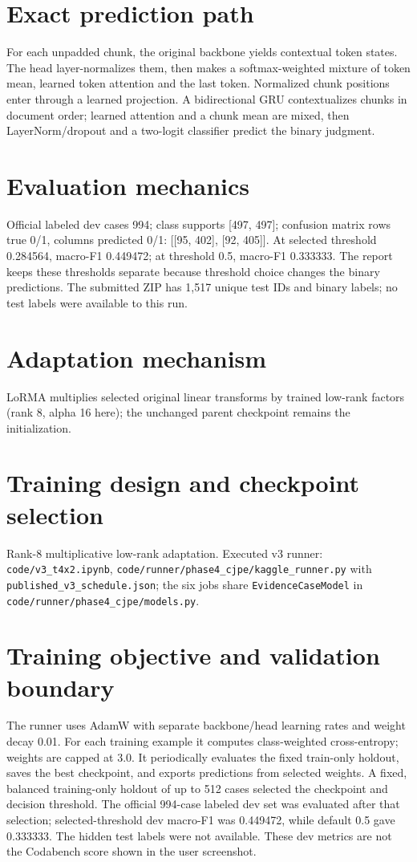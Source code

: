 \documentclass[11pt,a4paper]{article}
\begin{document}
\section{Exact prediction path}
For each unpadded chunk, the original backbone yields contextual token states. The head layer-normalizes them, then makes a softmax-weighted mixture of token mean, learned token attention and the last token. Normalized chunk positions enter through a learned projection. A bidirectional GRU contextualizes chunks in document order; learned attention and a chunk mean are mixed, then LayerNorm/dropout and a two-logit classifier predict the binary judgment.
\section{Evaluation mechanics}
Official labeled dev cases 994; class supports [497, 497]; confusion matrix rows true 0/1, columns predicted 0/1: [[95, 402], [92, 405]]. At selected threshold 0.284564, macro-F1 0.449472; at threshold 0.5, macro-F1 0.333333. The report keeps these thresholds separate because threshold choice changes the binary predictions. The submitted ZIP has 1,517 unique test IDs and binary labels; no test labels were available to this run.
\section{Adaptation mechanism}
LoRMA multiplies selected original linear transforms by trained low-rank factors (rank 8, alpha 16 here); the unchanged parent checkpoint remains the initialization.
\section{Training design and checkpoint selection}
Rank-8 multiplicative low-rank adaptation. Executed v3 runner: \texttt{code/v3\_t4x2.ipynb}, \texttt{code/runner/phase4\_cjpe/kaggle\_runner.py} with \texttt{published\_v3\_schedule.json}; the six jobs share \texttt{EvidenceCaseModel} in \texttt{code/runner/phase4\_cjpe/models.py}.
\section{Training objective and validation boundary}
The runner uses AdamW with separate backbone/head learning rates and weight decay 0.01. For each training example it computes class-weighted cross-entropy; weights are capped at 3.0. It periodically evaluates the fixed train-only holdout, saves the best checkpoint, and exports predictions from selected weights. A fixed, balanced training-only holdout of up to 512 cases selected the checkpoint and decision threshold. The official 994-case labeled dev set was evaluated after that selection; selected-threshold dev macro-F1 was 0.449472, while default 0.5 gave 0.333333. The hidden test labels were not available. These dev metrics are not the Codabench score shown in the user screenshot.
\end{document}

